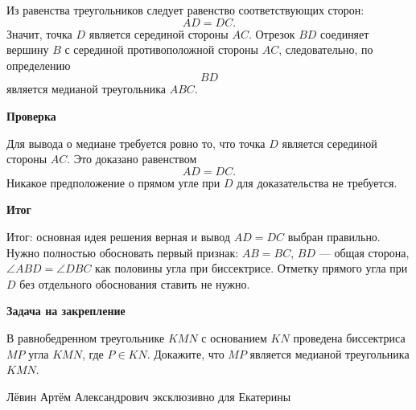 \documentclass[12pt,a4paper]{article}
\newcommand{\finalnote}[1]{\textcolor{teal!60!black}{Итог:} #1}
\newcommand{\subhead}[1]{\vspace{0.3em}\textbf{#1}\par}
\begin{document}
Из равенства треугольников следует равенство соответствующих сторон:
\[
AD=DC.
\]
Значит, точка $D$ является серединой стороны $AC$.
Отрезок $BD$ соединяет вершину $B$ с серединой противоположной стороны
$AC$, следовательно, по определению
\[
BD
\]
является медианой треугольника $ABC$.

\subhead{Проверка}
Для вывода о медиане требуется ровно то, что точка $D$ является серединой
стороны $AC$.
Это доказано равенством
\[
AD=DC.
\]
Никакое предположение о прямом угле при $D$ для доказательства не требуется.

\subhead{Итог}
\finalnote{основная идея решения верная и вывод $AD=DC$ выбран правильно.
Нужно полностью обосновать первый признак:
$AB=BC$, $BD$ --- общая сторона,
$\angle ABD=\angle DBC$ как половины угла при биссектрисе.
Отметку прямого угла при $D$ без отдельного обоснования ставить не нужно.}

\subhead{Задача на закрепление}
В равнобедренном треугольнике $KMN$ с основанием $KN$
проведена биссектриса $MP$ угла $KMN$, где $P\in KN$.
Докажите, что $MP$ является медианой треугольника $KMN$.

\vfill
\begin{center}
\small Лёвин Артём Александрович эксклюзивно для Екатерины
\end{center}
\end{document}
